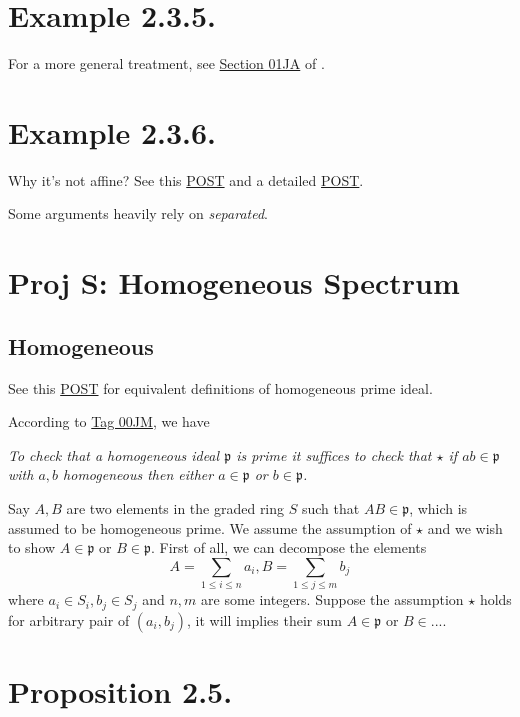\section{Example 2.3.5.}

For a more general treatment, see \href{https://stacks.math.columbia.edu/tag/01JA}{Section 01JA} of \cite{stacks-project}.

\section{Example 2.3.6.}

Why it's not affine? See this \href{https://mathoverflow.net/questions/87480/explanation-on-a-scheme-which-is-not-affine-scheme}{POST} and a detailed \href{https://math.stackexchange.com/questions/4281800/example-of-scheme-which-is-not-an-affine-scheme}{POST}. 

Some arguments heavily rely on \textit{separated}.

\section{Proj S: Homogeneous Spectrum}

\subsection{Homogeneous}

See this \href{https://math.stackexchange.com/questions/4027174/homogeneous-ideal-in-kx-0-x-n}{POST} for equivalent definitions of homogeneous prime ideal. 

According to \href{https://stacks.math.columbia.edu/tag/00JM}{Tag 00JM}, we have

\textit{To check that a homogeneous ideal $\mathfrak p$ is prime it suffices to check that $\star$ if $ab\in \mathfrak p$ with $a,b$ homogeneous then either $a\in \mathfrak p$ or $b\in \mathfrak p$.}

Say $A,B$ are two elements in the graded ring $S$ such that $AB\in \mathfrak p$, which is assumed to be homogeneous prime. We assume the assumption of $\star$ and we wish to show $A\in\mathfrak p$ or $B\in\mathfrak p$. First of all, we can decompose the elements 
\[A=\sum_{1\leq i\leq n} a_i, B=\sum_{1\leq j\leq m}b_j\] where $a_i\in S_i, b_j\in S_j$ and $n,m$ are some integers. Suppose the assumption $\star$ holds for arbitrary pair of $(a_i,b_j)$, it will implies their sum $A\in \mathfrak p$ or $B\in...$. 

\section{Proposition 2.5.}

